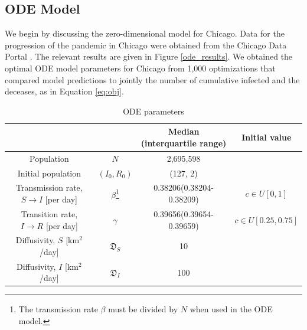 \documentclass[11pt]{article}
\newcommand{\D}{\mathfrak{D}}
\begin{document}
\subsection{ODE Model}
We begin by discussing the zero-dimensional model for Chicago.
Data for the progression of the pandemic in Chicago were obtained from the Chicago Data Portal \cite{Chicago_2021}.
The relevant results are given in Figure \ref{ode_results}.
We obtained the optimal ODE model parameters for Chicago from 1,000 optimizations that compared model predictions to jointly the number of cumulative infected and the deceases, as in Equation \ref{eq:obj}.

\begin{savenotes}
\begin{table}[h]
	\centering
	\caption{ODE parameters}
	\label{tab:parameters}
	\begin{tabular}{ c c c c }
		\hline
		\hline
			&	&	Median (interquartile range)	&	Initial value \\
		\hline
		Population	&	$N$	&	2,695,598 \\
		Initial population	&	$(I_0, R_0)$	&	(127, 2) \\
		Transmission rate, $S \rightarrow I$ [per day]	&	$\beta$\footnote{The transmission rate $\beta$ must be divided by $N$ when used in the ODE model.}	&	0.38206(0.38204-0.38209)	&	$c \in U[0,1]$ \\
		Transition rate, $I \rightarrow R$ [per day]	&	$\gamma$	&	 0.39656(0.39654-0.39659)	&	$c \in U[0.25,0.75]$ \\
		Diffusivity, $S$ [km$^2$/day]	&	$\D_S$	&	10	&	\\
		Diffusivity, $I$ [km$^2$/day]	&	$\D_I$	&	100	&	\\
		\hline
		\hline
	\end{tabular}
\end{table}
\end{savenotes}
\end{document}
